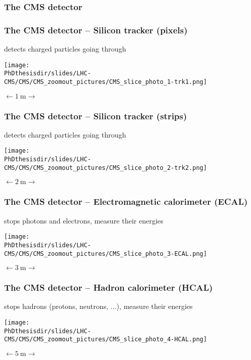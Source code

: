 \begin{frame}
\frametitle{The CMS detector}
\end{frame}
\begin{frame}\addtocounter{framenumber}{-1}
\frametitle{The CMS detector -- Silicon tracker (pixels)}
\begin{center}
detects charged particles going through

\vfill

\texttt{[image: \\PhDthesisdir/slides/LHC-CMS/CMS/CMS\_zoomout\_pictures/CMS\_slice\_photo\_1-trk1.png]}

\vfill

$\longleftarrow \SI{1}{\meter} \longrightarrow$
\end{center}
\end{frame}
\begin{frame}\addtocounter{framenumber}{-1}
\frametitle{The CMS detector -- Silicon tracker (strips)}
\begin{center}
detects charged particles going through

\vfill

\texttt{[image: \\PhDthesisdir/slides/LHC-CMS/CMS/CMS\_zoomout\_pictures/CMS\_slice\_photo\_2-trk2.png]}

\vfill

$\longleftarrow \SI{2}{\meter} \longrightarrow$
\end{center}
\end{frame}
\begin{frame}\addtocounter{framenumber}{-1}
\frametitle{The CMS detector -- Electromagnetic calorimeter (ECAL)}
\begin{center}
stops photons and electrons, measure their energies

\vfill

\texttt{[image: \\PhDthesisdir/slides/LHC-CMS/CMS/CMS\_zoomout\_pictures/CMS\_slice\_photo\_3-ECAL.png]}

\vfill

$\longleftarrow \SI{3}{\meter} \longrightarrow$
\end{center}
\end{frame}
\begin{frame}\addtocounter{framenumber}{-1}
\frametitle{The CMS detector -- Hadron calorimeter (HCAL)}
\begin{center}
stops hadrons (protons, neutrons, ...), measure their energies

\vfill

\texttt{[image: \\PhDthesisdir/slides/LHC-CMS/CMS/CMS\_zoomout\_pictures/CMS\_slice\_photo\_4-HCAL.png]}

\vfill

$\longleftarrow \SI{5}{\meter} \longrightarrow$
\end{center}
\end{frame}
